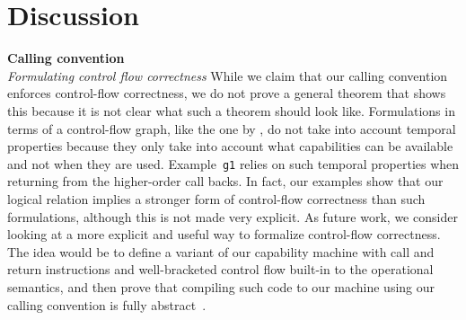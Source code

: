 \documentclass[format=acmsmall, review=true, screen=true]{acmart}
\newcommand{\itoplas}[1]%
    {{\color{OliveGreen} #1}}
\newcommand{\itoplassug}[1]{}
\begin{document}
\section{Discussion}
\label{sec:discussion}
\itoplassug{Reviewer C, esop, would have liked a discussion of (a) what could be done on a machine with a smaller set of capabilities, e.g., no local capability (we could probably not have done anything as the stack pointer could be stored on the heap and reused at unintended times.) and (b) what could be done with a larger/stronger set of available capabilities (we could include a discussion of linear capabilities).}
\itoplassug{Reviewer C, esop, asks whether our attacker model is reasonable (see tex comment). Maybe we should include a short discussion of the attacker model.}
\itoplassug{Should we include a discussion of how this ``scales'' to other things like a multi-core setting or if we needed tail calls?}
\noindent\textbf{Calling convention}\\
\emph{Formulating control flow correctness} While we claim that our calling
convention enforces control-flow correctness, we do not prove a general theorem
that shows this because it is not clear what such a theorem should look like.
Formulations in terms of a control-flow graph, like the one by \citet{abadi_control-flow_2005}, do not take into account temporal properties \itoplas{because they only take into account what capabilities can be available and not when they are used.
Example~\texttt{g1} relies on such temporal properties when returning from the higher-order call backs.}
In fact, our examples show that our logical relation implies a stronger form of
control-flow correctness than such formulations, although this is not made very
explicit. As future work, we consider looking at a more explicit and useful way
to formalize control-flow correctness. The idea would be to define a variant
of our capability machine with call and return instructions and
well-bracketed control flow built-in to the operational semantics, and then
prove that compiling such code to our machine using our calling convention is
fully abstract~\citep{abadi_protection_1998}.
\itoplassug{Maybe elaborate on why full-abstractness and not weaker properties like ``robust safety''.}
\end{document}

